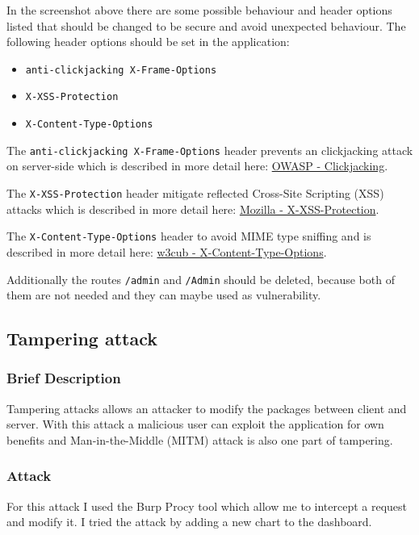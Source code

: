 In the screenshot above there are some possible behaviour and header options listed that should be changed to be secure and avoid unexpected behaviour. The following header options should be set in the application:
\begin{itemize}
    \item \lstinline "anti-clickjacking X-Frame-Options"
    \item \lstinline "X-XSS-Protection"
    \item \lstinline "X-Content-Type-Options"
\end{itemize}
The \lstinline "anti-clickjacking X-Frame-Options" header prevents an clickjacking attack on server-side which is described in more detail here: \href{https://owasp.org/www-community/attacks/Clickjacking}{OWASP - Clickjacking}.

The \lstinline "X-XSS-Protection" header mitigate reflected Cross-Site Scripting (XSS) attacks which is described in more detail here: \href{https://developer.mozilla.org/en-US/docs/Web/HTTP/Headers/X-XSS-Protection}{Mozilla - X-XSS-Protection}.

The \lstinline "X-Content-Type-Options" header to avoid MIME type sniffing and is described in more detail here: \href{https://docs.w3cub.com/http/headers/x-content-type-options}{w3cub - X-Content-Type-Options}.

Additionally the routes \lstinline "/admin" and \lstinline "/Admin" should be deleted, because both of them are not needed and they can maybe used as vulnerability.

\subsection{Tampering attack}
\subsubsection{Brief Description}
Tampering attacks allows an attacker to modify the packages between client and server. With this attack a malicious user can exploit the application for own benefits and Man-in-the-Middle (MITM) attack is also one part of tampering.

\subsubsection{Attack}
For this attack I used the Burp Procy tool which allow me to intercept a request and modify it. I tried the attack by adding a new chart to the dashboard.

